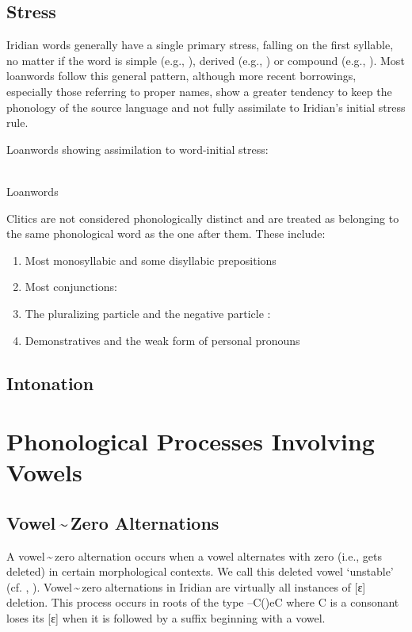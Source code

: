\subsection{Stress} Iridian words generally have a single primary
stress, falling on the first syllable, no matter if the word is simple (e.g.,
), derived (e.g., ) or
compound (e.g., ). Most loanwords follow this
general pattern, although more recent borrowings, especially those referring to
proper names, show a greater tendency to keep the phonology of the source
language and not fully assimilate to Iridian's initial stress rule.

\pex
\a Loanwords showing assimilation to word-initial stress:\\
\\

\a Loanwords
\xe

Clitics are not considered phonologically distinct and are treated
as belonging to the same phonological word as the one after them. These include:

\begin{enumerate}[noitemsep,label=(\alph*)]
	\item Most monosyllabic and some disyllabic prepositions
	\item Most conjunctions:
	\item The pluralizing particle  and the negative particle
	: 
	\item Demonstratives and the weak form of personal pronouns
\end{enumerate}

\subsection{Intonation}

\section{Phonological Processes Involving Vowels}

\subsection{Vowel\,\sim\,Zero Alternations}

A vowel\,\sim\,zero alternation occurs when a vowel alternates with zero (i.e.,
gets deleted) in certain morphological contexts. We call this deleted vowel
`unstable' (cf. \cite{siptar2000}, \cite{gussmann2007}). Vowel\,\sim\,zero
alternations in Iridian are virtually all instances of [ɛ] deletion. This
process occurs in roots of the type --C()eC where C is a consonant loses
its [ɛ] when it is followed by a suffix beginning with a vowel.

